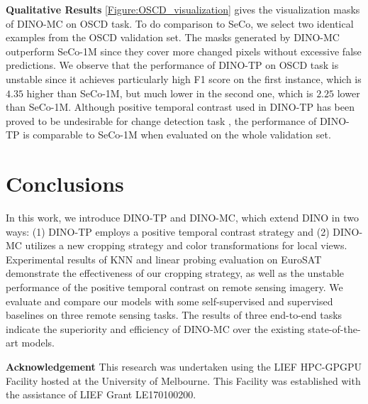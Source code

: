 \documentclass[10pt,twocolumn,letterpaper]{article}
\begin{document}
\textbf{Qualitative Results}
\cref{Figure:OSCD_visualization} gives the visualization masks of DINO-MC on OSCD task.
To do comparison to SeCo, we select two identical examples from the OSCD validation set.
The masks generated by DINO-MC outperform SeCo-1M since they cover more changed pixels without excessive false predictions.
We observe that the performance of DINO-TP on OSCD task is unstable since it achieves particularly high F1 score on the first instance, which is $4.35$ higher than SeCo-1M, but much lower in the second one, which is $2.25$ lower than SeCo-1M. 
Although positive temporal contrast used in DINO-TP has been proved to be undesirable for change detection task \cite{manas2021seasonal}, the performance of DINO-TP is comparable to SeCo-1M when evaluated on the whole validation set.




\section{Conclusions}
In this work, we introduce DINO-TP and DINO-MC, which extend DINO in two ways: (1) DINO-TP employs a positive temporal contrast strategy and (2) DINO-MC utilizes a new cropping strategy and color transformations for local views.
Experimental results of KNN and linear probing evaluation on EuroSAT demonstrate the effectiveness of our cropping strategy, as well as the unstable performance of the positive temporal contrast on remote sensing imagery.
We evaluate and compare our models with some self-supervised and supervised baselines on three remote sensing tasks.
The results of three end-to-end tasks indicate the superiority and efficiency of DINO-MC over the existing state-of-the-art models.




\textbf{Acknowledgement}
This research was undertaken using the LIEF HPC-GPGPU Facility hosted at the University of Melbourne. This Facility was established with the assistance of LIEF Grant LE170100200.

{\small


}
\end{document}
